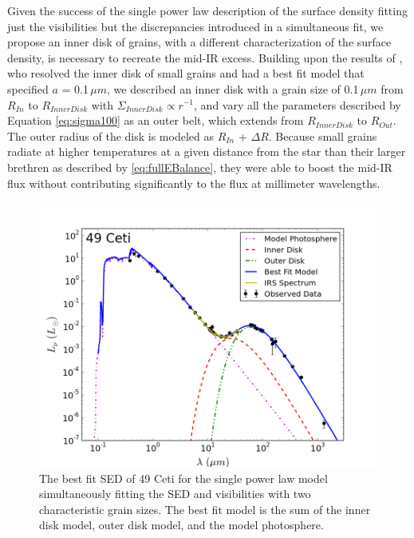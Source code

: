 Given the success of the single power law description of the surface density fitting just the visibilities but the discrepancies introduced in a simultaneous fit, we propose an inner disk of grains, with a different characterization of the surface density, is necessary to recreate the mid-IR excess. Building upon the results of \cite{Wahh07}, who resolved the inner disk of small grains and had a best fit model that specified $a$ = 0.1$\,\mu m$, we described an inner disk with a grain size of 0.1$\,\mu m$ from $R_{In}$ to $R_{Inner Disk}$ with $\Sigma_{Inner Disk} \propto r^{-1}$, and vary all the parameters described by Equation \ref{eq:sigma100} as an outer belt, which extends from $R_{Inner Disk}$ to $R_{Out}$. The outer radius of the disk is modeled as $R_{In}$ + $\Delta R$. Because small grains radiate at higher temperatures at a given distance from the star than their larger brethren as described by \ref{eq:fullEBalance}, they were able to boost the mid-IR flux without contributing significantly to the flux at millimeter wavelengths.


\begin{figure}%
\centering
\includegraphics[width = 1\textwidth]{49CET_nOBAG_SED.png}
\caption{The best fit SED of 49 Ceti for the single power law model simultaneously fitting the SED and visibilities with two characteristic grain sizes. The best fit model is the sum of the inner disk model, outer disk model, and the model photosphere.}
\label{fig:49CET_nOBAG_SED}
\end{figure}


